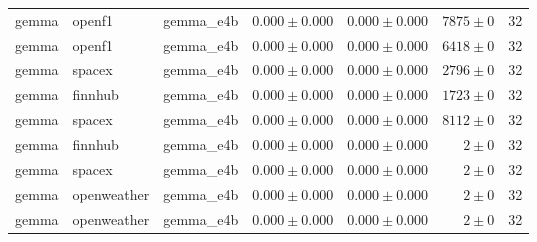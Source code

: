 \begin{table}[htbp]
\begin{tabular}{l l l r r r r}
gemma & openf1 & gemma\_e4b & $0.000\pm0.000$ & $0.000\pm0.000$ & $7875\pm0$ & 32 \\
gemma & openf1 & gemma\_e4b & $0.000\pm0.000$ & $0.000\pm0.000$ & $6418\pm0$ & 32 \\
gemma & spacex & gemma\_e4b & $0.000\pm0.000$ & $0.000\pm0.000$ & $2796\pm0$ & 32 \\
gemma & finnhub & gemma\_e4b & $0.000\pm0.000$ & $0.000\pm0.000$ & $1723\pm0$ & 32 \\
gemma & spacex & gemma\_e4b & $0.000\pm0.000$ & $0.000\pm0.000$ & $8112\pm0$ & 32 \\
gemma & finnhub & gemma\_e4b & $0.000\pm0.000$ & $0.000\pm0.000$ & $2\pm0$ & 32 \\
gemma & spacex & gemma\_e4b & $0.000\pm0.000$ & $0.000\pm0.000$ & $2\pm0$ & 32 \\
gemma & openweather & gemma\_e4b & $0.000\pm0.000$ & $0.000\pm0.000$ & $2\pm0$ & 32 \\
gemma & openweather & gemma\_e4b & $0.000\pm0.000$ & $0.000\pm0.000$ & $2\pm0$ & 32 \\
\hline
\end{tabular}
\end{table}
